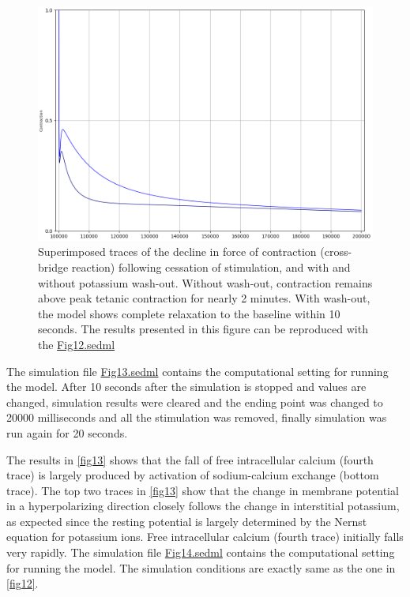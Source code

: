 \documentclass[fleqn,10pt]{physiome}
\begin{document}
\begin{figure}[h!]
\centering
\includegraphics[width=0.8\linewidth]{figure11}
\caption{Superimposed traces of the decline in force of contraction (cross-bridge reaction) following cessation of stimulation, and with and without potassium wash-out. Without wash-out, contraction remains above peak tetanic contraction for nearly 2 minutes. With wash-out, the model shows complete relaxation to the baseline within 10 seconds. The results presented in this figure can be reproduced with the \href{https://models.physiomeproject.org/workspace/5f4/file/26289d9227fbf4f66ca8106d8bf80ff9a51a5ac6/Fig12.sedml}{Fig12.sedml}}
\label{fig11}
\end{figure}



The simulation file \href{http://models.cellml.org/workspace/5f4/file/4071d5b4ec40c5e2b845a7a75e942df1966d2ba2/Fig13.sedml}{Fig13.sedml} contains the computational setting for running the model. After 10 seconds after the simulation is stopped and values are changed, simulation results were cleared and the ending point was changed to 20000 milliseconds and all the stimulation was removed, finally simulation was run again for 20 seconds.\newline


The results in \autoref{fig13} shows that the fall of free intracellular calcium (fourth trace) is largely produced by activation of sodium-calcium exchange (bottom trace). The top two traces in \autoref{fig13} show that the change in membrane potential in a hyperpolarizing direction closely follows the change in interstitial potassium, as expected since the resting potential is largely determined by the Nernst equation for potassium ions. Free intracellular calcium (fourth trace) initially falls very rapidly. The simulation file \href{http://models.cellml.org/workspace/5f4/file/4071d5b4ec40c5e2b845a7a75e942df1966d2ba2/Fig14.sedml}{Fig14.sedml} contains the computational setting for running the model. The simulation conditions are exactly same as the one in \autoref{fig12}.
\end{document}

